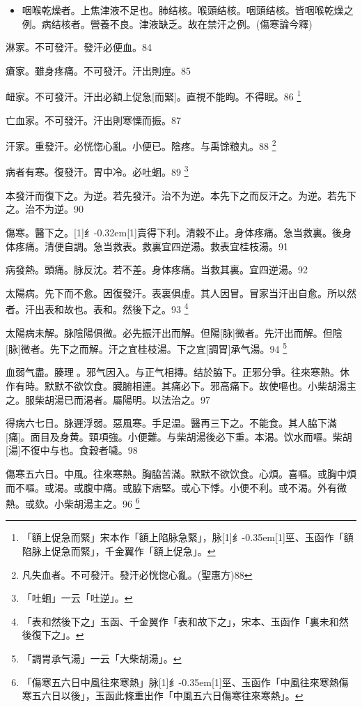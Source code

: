 \documentclass[oneside,b4paper]{ctexbook}
\begin{document}
\begin{flushleft}
\begin{itemize}
\item 咽喉乾燥者。上焦津液不足也。肺结核。喉頭结核。咽頭结核。皆咽喉乾燥之例。病结核者。營養不良。津液缺乏。故在禁汗之例。(傷寒論今釋)
\end{itemize}

淋家。不可發汗。發汗必便血。84

瘡家。雖身疼痛。不可發汗。汗出則痙。85

衄家。不可發汗。汗出必額上促急[而緊]。直視不能眴。不得眠。86
\footnote{「額上促急而緊」宋本作「額上陷脉急緊」，脉{\hbox{\scalebox{0.68}[1]{纟}\kern-0.35em\scalebox{0.64}[1]{巠}}}、玉函作「額陷脉上促急而緊」，千金翼作「額上促急」。}

亡血家。不可發汗。汗出則寒慄而振。87

汗家。重發汗。必恍惚心亂。小便已。陰疼。与禹馀粮丸。88
\footnote{凡失血者。不可發汗。發汗必恍惚心亂。(聖惠方)88}

病者有寒。復發汗。胃中冷。必吐蛔。89
\footnote{「吐蛔」一云「吐逆」。}

本發汗而復下之。为逆。若先發汗。治不为逆。本先下之而反汗之。为逆。若先下之。治不为逆。90

傷寒。醫下之。{\hbox{\scalebox{0.6}[1]{纟}\kern-0.32em\scalebox{0.7}[1]{賣}}}得下利。清穀不止。身体疼痛。急当救裏。後身体疼痛。清便自調。急当救表。救裏宜四逆湯。救表宜桂枝湯。91

病發熱。頭痛。脉反沈。若不差。身体疼痛。当救其裏。宜四逆湯。92

太陽病。先下而不愈。因復發汗。表裏俱虛。其人因冒。冒家当汗出自愈。所以然者。汗出表和故也。表和。然後下之。93
\footnote{「表和然後下之」玉函、千金翼作「表和故下之」，宋本、玉函作「裏未和然後復下之」。}

太陽病未解。脉陰陽俱微。必先振汗出而解。但陽[脉]微者。先汗出而解。但陰[脉]微者。先下之而解。汗之宜桂枝湯。下之宜[調胃]承气湯。94
\footnote{「調胃承气湯」一云「大柴胡湯」。}

血弱气盡。腠理{𫔭}。邪气因入。与正气相摶。结於脇下。正邪分爭。往來寒熱。休作有時。默默不欲饮食。臓腑相連。其痛必下。邪高痛下。故使嘔也。小柴胡湯主之。服柴胡湯已而渴者。屬陽明。以法治之。97

得病六七日。脉遲浮弱。惡風寒。手足温。醫再三下之。不能食。其人脇下滿[痛]。面目及身黄。頸項強。小便難。与柴胡湯後必下重。本渴。饮水而嘔。柴胡[湯]不復中与也。食穀者噦。98

傷寒五六日。中風。往來寒熱。胸脇苦滿。默默不欲饮食。心煩。喜嘔。或胸中煩而不嘔。或渴。或腹中痛。或脇下痞堅。或心下悸。小便不利。或不渴。外有微熱。或欬。小柴胡湯主之。96
\footnote{「傷寒五六日中風往來寒熱」脉{\hbox{\scalebox{0.68}[1]{纟}\kern-0.35em\scalebox{0.64}[1]{巠}}}、玉函作「中風往來寒熱傷寒五六日以後」，玉函此條重出作「中風五六日傷寒往來寒熱」。}


\end{flushleft}
\end{document}
